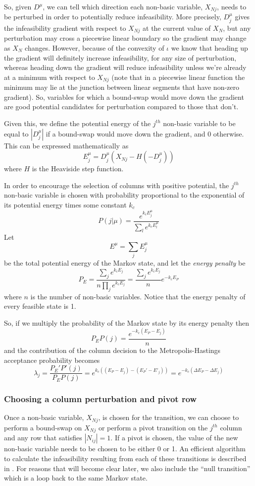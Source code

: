 \documentclass{article}
\begin{document}
So, given $D^\mu$, we can tell which direction each non-basic variable, $X_{Nj}$, needs to be perturbed in order to potentially reduce infeasibility. More precisely, $D^\mu_j$ gives the infeasibility gradient with respect to $X_{Nj}$ at the current value of $X_N$, but any perturbation may cross a piecewise linear boundary so the gradient may change as $X_N$ changes. However, because of the convexity of $\iota$ we know that heading up the gradient will definitely increase infeasibility, for any size of perturbation, whereas heading down the gradient will reduce infeasibility unless we're already at a minimum with respect to $X_{Nj}$ (note that in a piecewise linear function the minimum may lie at the junction between linear segments that have non-zero gradient). So, variables for which a bound-swap would move down the gradient are good potential candidates for perturbation compared to those that don't.

Given this, we define the potential energy of the $j^{th}$ non-basic variable to be equal to $|D^\mu_j|$ if a bound-swap would move down the gradient, and 0 otherwise. This can be expressed mathematically as
\[
E^\mu_j = D^\mu_j(X_{Nj} - H(-D^\mu_j))
\]
where $H$ is the Heaviside step function.

In order to encourage the selection of columns with positive potential, the $j^{th}$ non-basic variable is chosen with probability proportional to the exponential of its potential energy times some constant $k_c$
\[
P(j|\mu) = \frac{e^{k_cE^\mu_j}}{\sum_l e^{k_cE^\mu_l}}
\]
Let
\[
E^\mu = \sum_j E^\mu_j
\]
be the total potential energy of the Markov state, and let the \textit{energy penalty} be
\[
P_E = \frac{\sum_j e^{k_cE_j}}{n\prod_j e^{k_cE_j}} = \frac{\sum_j e^{k_cE_j}}{n} e^{-k_cE_P} 
\]
where $n$ is the number of non-basic variables. Notice that the energy penalty of every feasible state is 1.

So, if we multiply the probability of the Markov state by its energy penalty then
\[
P_EP(j) = \frac{e^{-k_c(E_P - E_j)}}{n}
\]
and the contribution of the column decision to the Metropolis-Hastings acceptance probability becomes
\[
\lambda_j = \frac{P_E'P'(j)}{P_EP(j)} = e^{k_c((E_P-E_j) - (E_P' - E'_j))} = e^{-k_c(\Delta E_P - \Delta E_j)}
\]

\subsubsection{Choosing a column perturbation and pivot row}

Once a non-basic variable, $X_{Nj}$, is chosen for the transition, we can choose to perform a bound-swap on $X_{Nj}$ or perform a pivot transition on the $j^{th}$ column and any row that satisfies $|N_{ij}|=1$. If a pivot is chosen, the value of the new non-basic variable needs to be chosen to be either 0 or 1. An efficient algorithm to calculate the infeasibility resulting from each of these transitions is described in \cite[Chapter~9]{maros2002computational}. For reasons that will become clear later, we also include the ``null transition'' which is a loop back to the same Markov state.
\end{document}
